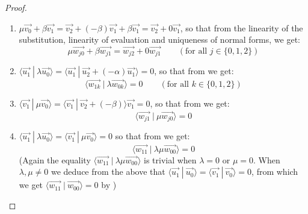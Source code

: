 \documentclass[runningheads,orivec,envcountsame,envcountsect]{llncs}
\def\scal#1#2{\langle{#1}~|~{#2}\rangle}
\begin{document}
\begin{lemma}
\begin{proof}
\begin{enumerate}
        \item\label{A9:it2} $\mu\vec{v_0} + \beta\vec{v_1}=\vec{v_2} + (-\beta) \vec{v_1} + \beta \vec{v_1} = \vec{v_2} + 0 \vec{v_1}$, so that from the linearity of the substitution, linearity of evaluation and uniqueness of normal forms, we get:
        \[
        \mu\vec{w_{j0}} + \beta \vec{w_{j1}} = \vec{w_{j2}} + 0 \vec{w_{j1}} \qquad(\text{for all }j\in\{0,1,2\})
        \]
        
        \item\label{A9:it3} $\scal{\vec{u_1}}{\lambda\vec{u_0}}=\scal{\vec{u_1}}{\vec{u_2}+(- \alpha)\vec{u_1}}=0$, so that from  we get:
        \[
        \scal{\vec{w_{1k}}}{\lambda\vec{w_{0k}}}= 0 \qquad(\text{for all }k\in\{0,1,2\})
        \]
        
        \item\label{A9:it4} $\scal{\vec{v_1}}{\mu\vec{v_0}}=\scal{\vec{v_1}}{\vec{v_2} + (-\beta)}\vec{v_1}=0$, so that from  we get:
        \[
        \scal{\vec{w_{j1}}}{\mu\vec{w_{j0}}}=0
        \]
                
        \item\label{A9:it5} $\scal{\vec{u_1}}{\lambda\vec{u_0}}=\scal{\vec{v_1}}{\mu\vec{v_0}}=0$ so that from  we get:
        \[
        \scal{\vec{w_{11}}}{\lambda\mu\vec{w_{00}}}=0
        \]
        (Again the equality $\scal{\vec{w_{11}}}{\lambda\mu\vec{w_{00}}}$ is trivial when $\lambda=0$ or $\mu=0$. When $\lambda ,\mu\neq 0$ we deduce from the above that $\scal{\vec{u_1}}{\vec{u_0}}=\scal{\vec{v_1}}{\vec{v_0}}=0$, from which we get $\scal{\vec{w_{11}}}{\vec{w_{00}}}=0$ by )
    \end{enumerate}


\end{proof}
\end{lemma}
\end{document}
